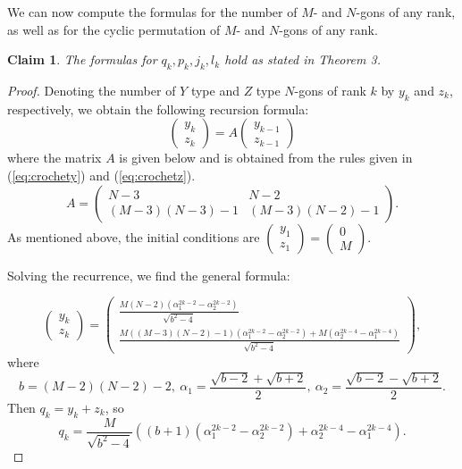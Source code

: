 \documentclass[11pt, oneside]{article}   	%
\newtheorem{claim}{Claim}
\begin{document}
We can now compute the formulas for the number of $M$- and $N$-gons of any rank, as well as for the cyclic permutation of $M$- and $N$-gons of any rank.
\begin{claim}
The formulas for $q_k,p_k,j_k,l_k$ hold as stated in Theorem 3.
\end{claim}
\begin{proof}
Denoting the number of $Y$ type and $Z$ type $N$-gons of rank $k$ by $y_k$ and $z_k$, respectively, we obtain the following recursion formula:
\begin{equation} \label{eq:yz-recurrence}
\begin{pmatrix}
  y_{k} \\
  z_{k}
 \end{pmatrix}
=
A \begin{pmatrix}y_{k-1} \\ z_{k-1} \end{pmatrix}
\end{equation}
where the matrix $A$ is given below and is obtained from the rules given in (\ref{eq:crochety}) and (\ref{eq:crochetz}).
\begin{equation}
\label{eq:Amatrix}
A =
\begin{pmatrix}
N-3 & N-2 \\
(M-3)(N-3)-1 & (M-3)(N-2)-1
\end{pmatrix}.
\end{equation}
As mentioned above, the initial conditions are 
$\left(\begin{matrix} 
y_1 \\ z_1
\end{matrix}\right)
=
\left(\begin{matrix} 
0 \\ M
\end{matrix}\right)$. 

Solving the recurrence, we find the general formula:

$$
\begin{pmatrix}
  y_{k} \\
  z_{k}
 \end{pmatrix}
=
\begin{pmatrix}
\frac{M(N-2)(\alpha_1^{2k-2}-\alpha_2^{2k-2})}{\sqrt{b^2-4}} \\
\frac{M((M-3)(N-2)-1)(\alpha_1^{2k-2}-\alpha_2^{2k-2}) + M(\alpha_2^{2k-4}-\alpha_1^{2k-4})}{\sqrt{b^2-4}}
\end{pmatrix},
$$
where 
$$b = (M-2)(N-2)-2,\ 
\alpha_{1} = \frac{\sqrt{b-2} + \sqrt{b+2}}{2},\ 
\alpha_{2} = \frac{\sqrt{b-2} - \sqrt{b+2}}{2}.$$
Then $q_k = y_k + z_k$, so
$$
q_k = \frac{M}{\sqrt{b^2-4}}\left( 
(b+1)(\alpha_1^{2k-2} - \alpha_2^{2k-2}) +
\alpha_2^{2k-4} - \alpha_1^{2k-4}
\right).
$$


\end{proof}
\end{document}
